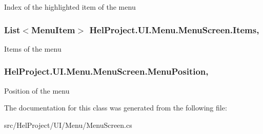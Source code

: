Index of the highlighted item of the menu 

\hypertarget{class_hel_project_1_1_u_i_1_1_menu_1_1_menu_screen_a5c4e68d9b5187dde747e872b719d2886}{}
\subsubsection[{Items}]{\setlength{\rightskip}{0pt plus 5cm}List$<${\bf Menu\+Item}$>$ Hel\+Project.\+U\+I.\+Menu.\+Menu\+Screen.\+Items\hspace{0.3cm}{\ttfamily [get]}, {\ttfamily [set]}}\label{class_hel_project_1_1_u_i_1_1_menu_1_1_menu_screen_a5c4e68d9b5187dde747e872b719d2886}


Items of the menu 

\hypertarget{class_hel_project_1_1_u_i_1_1_menu_1_1_menu_screen_a112ebabb44410ac6eee8a5b73ce59793}{}
\subsubsection[{Menu\+Position}]{ Hel\+Project.\+U\+I.\+Menu.\+Menu\+Screen.\+Menu\+Position\hspace{0.3cm}{\ttfamily [get]}, {\ttfamily [set]}}\label{class_hel_project_1_1_u_i_1_1_menu_1_1_menu_screen_a112ebabb44410ac6eee8a5b73ce59793}


Position of the menu 



The documentation for this class was generated from the following file\+:\begin{DoxyCompactItemize}
\item 
src/\+Hel\+Project/\+U\+I/\+Menu/Menu\+Screen.\+cs\end{DoxyCompactItemize}
